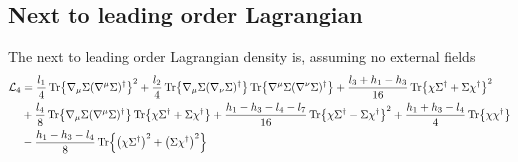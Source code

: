 \subsection{Next to leading order Lagrangian}

The next to leading order Lagrangian density is, assuming no external fields
\begin{align}
    \notag
    \mathcal{L}_4 
    & = 
    \frac{l_1}{4} \Tr{\nabla_\mu \Sigma (\nabla^\mu \Sigma)^\dagger}^2
    + \frac{l_2}{4} \Tr{\nabla_\mu \Sigma (\nabla_\nu \Sigma)^\dagger} 
    \Tr{\nabla^\mu \Sigma (\nabla^\nu \Sigma)^\dagger} 
    +
    \frac{l_3 + h_1 - h_3 }{16} \Tr{\chi \Sigma^\dagger + \Sigma \chi^\dagger}^2
    \\ \notag
    &
    + \frac{l_4}{8}\Tr{\nabla_\mu \Sigma (\nabla^\mu \Sigma)^\dagger} \Tr{\chi \Sigma^\dagger + \Sigma \chi^\dagger}
    + \frac{h_1 - h_3 - l_4-l_7}{16} \Tr{\chi \Sigma^\dagger - \Sigma \chi^\dagger}^2
    + \frac{h_1 + h_3 - l_4}{4} \Tr{\chi \chi^\dagger} \\
    & -
    \frac{h_1 - h_3 - l_4}{8} 
        \Tr{\left(\chi \Sigma^\dagger\right)^2 + \left( \Sigma \chi^\dagger\right)^2}
    \label{NLO Lagrangian}
\end{align}
 
